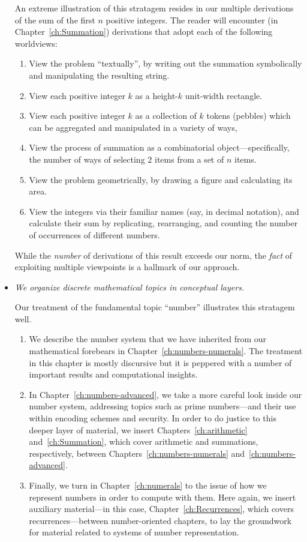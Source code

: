 \begin{itemize}
An extreme illustration of this stratagem resides in our multiple derivations of the sum of the first $n$ positive integers.  The reader will encounter (in Chapter~\ref{ch:Summation}) derivations that adopt each of the following worldviews:
  \begin{enumerate}
    \item
View the problem ``textually'', by writing out the summation symbolically and manipulating the resulting string.
  \item
View each positive integer $k$ as a height-$k$ unit-width rectangle.
  \item
View each positive integer $k$ as a collection of $k$ tokens (pebbles) which can be aggregated and manipulated in a variety of ways,
  \item
View the process of summation as a combinatorial object---specifically, the number of ways of selecting $2$ items from a set of $n$ items.
  \item
View the problem geometrically, by drawing a figure and calculating its area.
  \item
View the integers via their familiar names (say, in decimal notation), and calculate their sum by replicating, rearranging, and counting the number of occurrences of different numbers.
  \end{enumerate}
While the {\em number} of derivations of this result exceeds our norm, the {\em fact} of exploiting multiple viewpoints is a hallmark of our approach.

\item
{\em We organize discrete mathematical topics in conceptual layers.}

\smallskip

Our treatment of the fundamental topic ``number'' illustrates this stratagem well.
  \begin{enumerate}
  \item
We describe the number system that we have inherited from our mathematical forebears in Chapter~\ref{ch:numbers-numerals}.  The treatment in this chapter is mostly discursive but it is peppered with a number of important results and computational insights.
  \item
In Chapter~\ref{ch:numbers-advanced}, we take a more careful look inside our number system, addressing topics such as prime numbers---and their use within encoding schemes and security.  In order to do justice to this deeper layer of material, we insert Chapters~\ref{ch:arithmetic} and~\ref{ch:Summation}, which cover arithmetic and summations, respectively, between
Chapters~\ref{ch:numbers-numerals} and~\ref{ch:numbers-advanced}.
  \item
Finally, we turn in Chapter~\ref{ch:numerals} to the issue of how we represent numbers in order to compute with them.  Here again, we insert auxiliary material---in this case, Chapter~\ref{ch:Recurrences}, which covers recurrences---between number-oriented chapters, to lay the groundwork for material related to systems of number representation.
  \end{enumerate}


\end{itemize}

